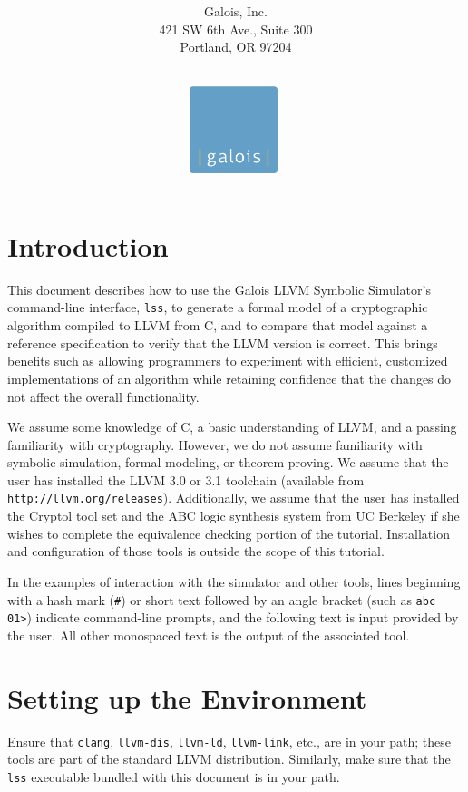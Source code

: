 \documentclass[11pt]{article}
\title{\LARGE{\bf \titleline}}
\author{\\$ $\\$ $\\
        Galois, Inc.\\
        421 SW 6th Ave., Suite 300\\Portland, OR 97204}
\date{
\vspace*{2cm}$ $\\
\includegraphics[height=1in]{images/Galois_logo_blue_box.pdf}
\vspace*{2cm}$ $\\
}
\begin{document}
\maketitle
\thispagestyle{empty}
\newpage

\section{Introduction}

This document describes how to use the Galois LLVM Symbolic Simulator's
command-line interface, \texttt{lss}, to generate a formal model of a
cryptographic algorithm compiled to LLVM from C, and to compare that
model against a reference specification to verify that the LLVM version
is correct. This brings benefits such as allowing programmers to
experiment with efficient, customized implementations of an algorithm
while retaining confidence that the changes do not affect the overall
functionality.

We assume some knowledge of C, a basic understanding of LLVM, and a
passing familiarity with cryptography. However, we do not assume
familiarity with symbolic simulation, formal modeling, or theorem
proving.  We assume that the user has installed the LLVM 3.0 or 3.1
toolchain (available from \texttt{http://llvm.org/releases}).
Additionally, we assume that the user has installed the Cryptol tool set
and the ABC logic synthesis system from UC Berkeley if she wishes to
complete the equivalence checking portion of the tutorial.  Installation
and configuration of those tools is outside the scope of this tutorial.

In the examples of interaction with the simulator and other tools, lines
beginning with a hash mark (\texttt{\#}) or short text followed by an
angle bracket (such as \texttt{abc 01>}) indicate command-line prompts,
and the following text is input provided by the user. All other
monospaced text is the output of the associated tool.

\section{Setting up the Environment}
\label{sec:setup}
 
Ensure that \texttt{clang}, \texttt{llvm-dis}, \texttt{llvm-ld},
\texttt{llvm-link}, etc., are in your path; these tools are part of the
standard LLVM distribution.  Similarly, make sure that the \texttt{lss}
executable bundled with this document is in your path.
\end{document}
